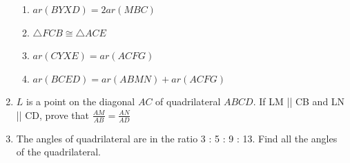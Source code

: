 \begin{enumerate}[label=\arabic*.,ref=\thesubsection.\theenumi]
\begin{enumerate}
\item $ar (BYXD) = 2 ar (MBC)$ 
\item $ \triangle  FCB \cong  \triangle  ACE$
\item $ar (CYXE) = ar (ACFG)$
\item  $ar (BCED) = ar (ABMN) + ar (ACFG)$
\end{enumerate}
\item $L$ is a point on the diagonal $AC$ of quadrilateral $ABCD$.  If LM || CB and LN || CD, prove that $\frac{AM}{AB}=\frac{ AN}{  AD}$
\item The angles of quadrilateral are in the ratio 3 : 5 : 9 : 13. Find all the angles of the quadrilateral.
\\
\solution


\end{enumerate}
